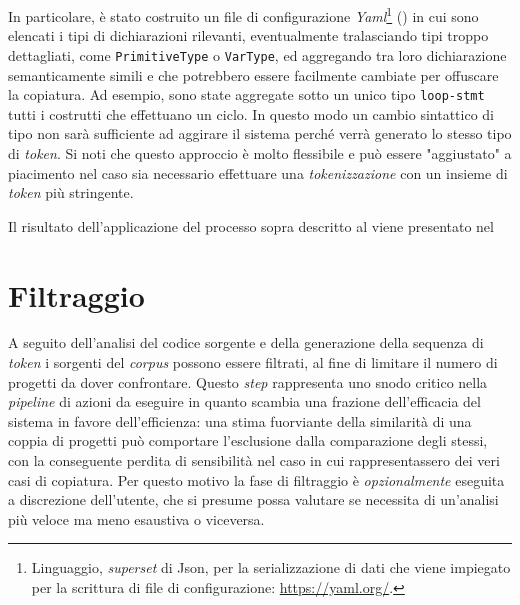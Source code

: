 In particolare, è stato costruito un file di configurazione \textit{Yaml}\footnote{Linguaggio, \textit{superset} di Json, per la serializzazione di dati che viene impiegato per la scrittura di file di configurazione: \url{https://yaml.org/}.} () in cui sono elencati i tipi di dichiarazioni rilevanti, eventualmente tralasciando tipi troppo dettagliati, come \texttt{PrimitiveType} o \texttt{VarType}, ed aggregando tra loro dichiarazione semanticamente simili e che potrebbero essere facilmente cambiate per offuscare la copiatura.
%
Ad esempio, sono state aggregate sotto un unico tipo \texttt{loop-stmt} tutti i costrutti che effettuano un ciclo.
%
In questo modo un cambio sintattico di tipo non sarà sufficiente ad aggirare il sistema perché verrà generato lo stesso tipo di \textit{token}.
%
Si noti che questo approccio è molto flessibile e può essere "aggiustato" a piacimento nel caso sia necessario effettuare una \textit{tokenizzazione} con un insieme di \textit{token} più stringente.



Il risultato dell'applicazione del processo sopra descritto al  viene presentato nel 




\section{Filtraggio}
A seguito dell'analisi del codice sorgente e della generazione della sequenza di \textit{token} i sorgenti del \textit{corpus} possono essere filtrati, al fine di limitare il numero di progetti da dover confrontare.
%
Questo \textit{step} rappresenta uno snodo critico nella \textit{pipeline} di azioni da eseguire in quanto scambia una frazione dell'efficacia del sistema in favore dell'efficienza: una stima fuorviante della similarità di una coppia di progetti può comportare l'esclusione dalla comparazione degli stessi, con la conseguente perdita di sensibilità nel caso in cui rappresentassero dei veri casi di copiatura.
%
Per questo motivo la fase di filtraggio è \textit{opzionalmente} eseguita a discrezione dell'utente, che si presume possa valutare se necessita di un'analisi più veloce ma meno esaustiva o viceversa.

